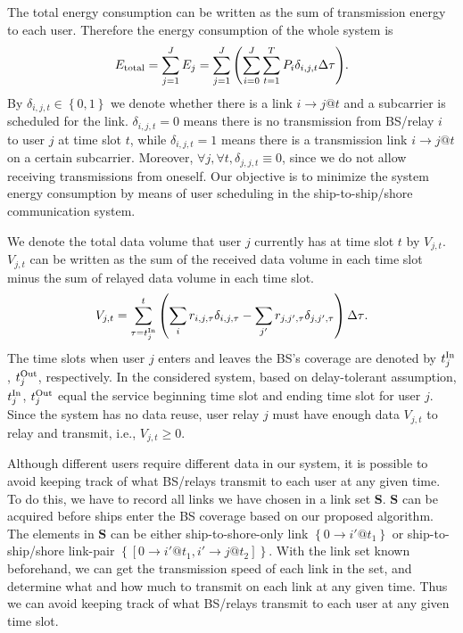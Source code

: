 \documentclass[journal]{IEEEtran}
\begin{document}
   The total energy consumption can be written as the sum of transmission energy to each user. 
   Therefore the energy consumption of the whole system is
   \begin{align}
    {E_{\rm{total}} = \sum\limits_{j = 1}^J {{E_j}} = \sum\limits_{j = 1}^J {\left( {\sum\limits_{i=0}^{J}{\sum\limits_{t = 1}^T {{P_{i}}\delta _{i,j,t}} } \Delta \tau  }\right)}}. 
    \end{align}
   By $\delta _{i,j,t} \in \left\{ {0,1} \right\}$ we denote whether there is a link $i \to j @ t$ and a subcarrier is scheduled for the link. $ {{\delta _{i,j,t}}} = 0$ means there is no transmission from BS/relay $i$ to user $j$ at time slot $t$, while $ {{\delta _{i,j,t}}} = 1$ means there is a transmission link $i \to j @ t$ on a certain subcarrier. Moreover, $\forall j,\forall t,{\delta _{j,j,t}} \equiv 0$, since we do not allow receiving transmissions from oneself. 
   Our objective is to minimize the system energy consumption by means of user scheduling in the ship-to-ship/shore communication system. 
   
   We denote the total data volume that user $j$ currently has at time slot $t$ by ${V_{j,t}}$. ${V_{j,t}}$ can be written as the sum of the received data volume in each time slot minus the sum of relayed data volume in each time slot. 
   \begin{align}
    {V_{j,t}} = \sum\limits_{\tau = t_j^{{\rm{In}}}}^t {\left( {\sum\limits_i {{r_{i,j,\tau }\delta _{i,j,\tau}}} - \sum\limits_{j'} {{r_{j,j',\tau }\delta _{j,j',\tau}}} } \right) \Delta \tau } .
   \end{align}
   The time slots when user $j$ enters and leaves the BS's coverage are denoted by $t_j^{{\rm{In}}}$, $t_j^{{\rm{Out}}}$, respectively. In the considered system, based on delay-tolerant assumption, $t_j^{{\rm{In}}}$, $t_j^{{\rm{Out}}}$ equal the service beginning time slot and ending time slot for user $j$. 
   Since the system has no data reuse, user relay $j$ must have enough data ${V_{j,t}}$ to relay and transmit, i.e., ${V_{j,t} \ge 0}$. 
  
   Although different users require different data in our system, it is possible to avoid keeping track of what BS/relays transmit to each user at any given time. To do this, we have to record all links we have chosen in a link set ${\mathbf{S}}$. ${\mathbf{S}}$ can be acquired before ships enter the BS coverage based on our proposed algorithm. The elements in ${\mathbf{S}}$ can be either ship-to-shore-only link $\left\{0 \to i'@{t_1}\right\}$ or ship-to-ship/shore link-pair $\left\{\left[ {0 \to i'@{t_1},i' \to j@{t_2}} \right]\right\}$. 
   With the link set known beforehand, we can get the transmission speed of each link in the set, and determine what and how much to transmit on each link at any given time. Thus we can avoid keeping track of what BS/relays transmit to each user at any given time slot. 
   
\end{document}
